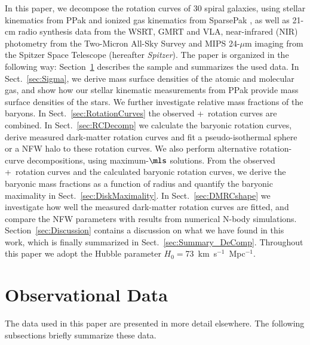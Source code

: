 \documentclass[traditabstract]{aa} %
\begin{document}
In this paper, we decompose the rotation curves of 30 spiral galaxies, 
using stellar kinematics from PPak \citep{verheyen2004, kelz2006} and ionized gas 
kinematics from SparsePak \citep{bershady2004, bershady2005}, as well as 21-cm radio 
synthesis data from the WSRT, GMRT and VLA, near-infrared (NIR) photometry from the
Two-Micron All-Sky Survey \citep[2MASS;][]{skrutski2006} and MIPS 24-$\mu$m imaging from
the Spitzer Space Telescope (hereafter {\it Spitzer}). The paper is organized in
the following way:
Section~\ref{sec:DataSummary} describes the sample and summarizes the used data. In
Sect.~\ref{sec:Sigma}, we derive mass surface densities of the atomic and molecular gas,
and show how our stellar kinematic measurements from PPak \citep[][hereafter 
]{martinsson2012a} provide mass surface densities of the
stars. We further investigate relative mass fractions of the baryons. 
In Sect.~\ref{sec:RotationCurves} the observed \hone+\halp\ rotation curves are combined.
In Sect.~\ref{sec:RCDecomp} we calculate the baryonic rotation curves, derive measured
dark-matter rotation curves and fit a pseudo-isothermal sphere or a NFW halo to these
rotation curves. We also perform alternative rotation-curve decompositions, using
maximum-$\mls$ solutions. From the observed \hone+\halp\ rotation curves and the
calculated baryonic rotation curves, we derive the baryonic mass fractions as a function
of radius and quantify the baryonic maximality in Sect.~\ref{sec:DiskMaximality}. In
Sect.~\ref{sec:DMRCshape} we investigate how well the measured dark-matter rotation curves
are fitted, and compare the NFW parameters with results from numerical N-body simulations.
Section~\ref{sec:Discussion} contains a discussion on what we have found in this work,
which is finally summarized in Sect.~\ref{sec:Summary_DeComp}. Throughout this paper we
adopt the Hubble parameter $H_0$$=$73~km~s$^{-1}$~Mpc$^{-1}$.


\section{Observational Data}
\label{sec:DataSummary}
The data used in this paper are presented in more detail elsewhere. The following
subsections briefly summarize these data.
\end{document}
